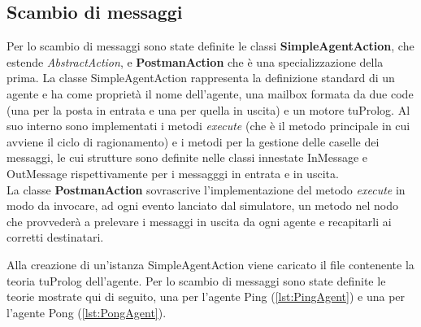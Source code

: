 \documentclass[12pt,a4paper,openright,twoside]{report}
\begin{document}
\subsection{Scambio di messaggi}
Per lo scambio di messaggi sono state definite le classi \textbf{SimpleAgentAction}, che estende \textit{AbstractAction}, e \textbf{PostmanAction} che \`e una specializzazione della prima. La classe SimpleAgentAction rappresenta la definizione standard di un agente e ha come propriet\`a il nome dell'agente, una mailbox formata da due code (una per la posta in entrata e una per quella in uscita) e un motore tuProlog. Al suo interno sono implementati i metodi \textit{execute} (che \`e il metodo principale in cui avviene il ciclo di ragionamento) e i metodi per la gestione delle caselle dei messaggi, le cui strutture sono definite nelle classi innestate InMessage e OutMessage rispettivamente per i messagggi in entrata e in uscita.
\\
La classe \textbf{PostmanAction} sovrascrive l'implementazione del metodo \textit{execute} in modo da invocare, ad ogni evento lanciato dal simulatore, un metodo nel nodo che provveder\`a a prelevare i messaggi in uscita da ogni agente e recapitarli ai corretti destinatari.

\bigskip

Alla creazione di un'istanza SimpleAgentAction viene caricato il file contenente la teoria tuProlog dell'agente. Per lo scambio di messaggi sono state definite le teorie mostrate qui di seguito, una per l'agente Ping (\ref{lst:PingAgent}) e una per l'agente Pong (\ref{lst:PongAgent}).
\end{document}
